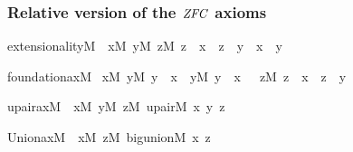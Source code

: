 \subsubsection*{Relative version of the $\mathit{ZFC}$ axioms}
\begin{isabelle}%
extensionality{\isacharparenleft}{\kern0pt}M{\isacharparenright}{\kern0pt}\ {\isasymequiv}\ {\isasymforall}x{\isacharbrackleft}{\kern0pt}M{\isacharbrackright}{\kern0pt}{\isachardot}{\kern0pt}\ {\isasymforall}y{\isacharbrackleft}{\kern0pt}M{\isacharbrackright}{\kern0pt}{\isachardot}{\kern0pt}\ {\isacharparenleft}{\kern0pt}{\isasymforall}z{\isacharbrackleft}{\kern0pt}M{\isacharbrackright}{\kern0pt}{\isachardot}{\kern0pt}\ z\ {\isasymin}\ x\ {\isasymlongleftrightarrow}\ z\ {\isasymin}\ y{\isacharparenright}{\kern0pt}\ {\isasymlongrightarrow}\ x\ {\isacharequal}{\kern0pt}\ y%
\end{isabelle}%
\begin{isabelle}%
foundation{\isacharunderscore}{\kern0pt}ax{\isacharparenleft}{\kern0pt}M{\isacharparenright}{\kern0pt}\ {\isasymequiv}\isanewline
{\isasymforall}x{\isacharbrackleft}{\kern0pt}M{\isacharbrackright}{\kern0pt}{\isachardot}{\kern0pt}\ {\isacharparenleft}{\kern0pt}{\isasymexists}y{\isacharbrackleft}{\kern0pt}M{\isacharbrackright}{\kern0pt}{\isachardot}{\kern0pt}\ y\ {\isasymin}\ x{\isacharparenright}{\kern0pt}\ {\isasymlongrightarrow}\ {\isacharparenleft}{\kern0pt}{\isasymexists}y{\isacharbrackleft}{\kern0pt}M{\isacharbrackright}{\kern0pt}{\isachardot}{\kern0pt}\ y\ {\isasymin}\ x\ {\isasymand}\ {\isasymnot}\ {\isacharparenleft}{\kern0pt}{\isasymexists}z{\isacharbrackleft}{\kern0pt}M{\isacharbrackright}{\kern0pt}{\isachardot}{\kern0pt}\ z\ {\isasymin}\ x\ {\isasymand}\ z\ {\isasymin}\ y{\isacharparenright}{\kern0pt}{\isacharparenright}{\kern0pt}%
\end{isabelle}%
\begin{isabelle}%
upair{\isacharunderscore}{\kern0pt}ax{\isacharparenleft}{\kern0pt}M{\isacharparenright}{\kern0pt}\ {\isasymequiv}\ {\isasymforall}x{\isacharbrackleft}{\kern0pt}M{\isacharbrackright}{\kern0pt}{\isachardot}{\kern0pt}\ {\isasymforall}y{\isacharbrackleft}{\kern0pt}M{\isacharbrackright}{\kern0pt}{\isachardot}{\kern0pt}\ {\isasymexists}z{\isacharbrackleft}{\kern0pt}M{\isacharbrackright}{\kern0pt}{\isachardot}{\kern0pt}\ upair{\isacharparenleft}{\kern0pt}M{\isacharcomma}{\kern0pt}\ x{\isacharcomma}{\kern0pt}\ y{\isacharcomma}{\kern0pt}\ z{\isacharparenright}{\kern0pt}%
\end{isabelle}%
\begin{isabelle}%
Union{\isacharunderscore}{\kern0pt}ax{\isacharparenleft}{\kern0pt}M{\isacharparenright}{\kern0pt}\ {\isasymequiv}\ {\isasymforall}x{\isacharbrackleft}{\kern0pt}M{\isacharbrackright}{\kern0pt}{\isachardot}{\kern0pt}\ {\isasymexists}z{\isacharbrackleft}{\kern0pt}M{\isacharbrackright}{\kern0pt}{\isachardot}{\kern0pt}\ big{\isacharunderscore}{\kern0pt}union{\isacharparenleft}{\kern0pt}M{\isacharcomma}{\kern0pt}\ x{\isacharcomma}{\kern0pt}\ z{\isacharparenright}{\kern0pt}%
\end{isabelle}%
